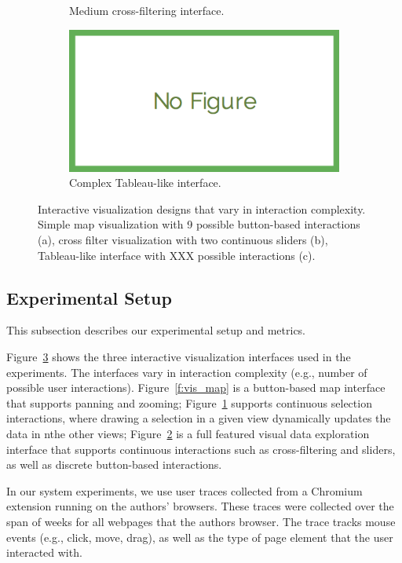 \begin{figure}
\begin{subfigure}[t]{.32\textwidth}
    \caption{Medium cross-filtering interface.}
    \label{f:vis_xfilter} 
  \end{subfigure}
  \begin{subfigure}[t]{.32\textwidth}
    \includegraphics[width = .99\columnwidth]{figures/nofig}
    \caption{Complex Tableau-like interface.}
    \label{f:vis_tableau} 
  \end{subfigure}
  \caption{Interactive visualization designs that vary in interaction complexity.  
  Simple map visualization with 9 possible button-based interactions (a), cross filter visualization with two continuous sliders (b),
Tableau-like interface with XXX possible interactions (c).}

  \label{f:interfaces}
\end{figure}



\subsection{Experimental Setup}
This subsection describes our experimental setup and metrics.

Figure~\ref{f:interfaces} shows the three interactive visualization interfaces used in the experiments.  The interfaces vary in interaction complexity (e.g., number of possible user interactions).  Figure~\ref{f:vis_map} is a button-based map interface that supports panning and zooming;  Figure~\ref{f:vis_xfilter} supports continuous selection interactions, where drawing a selection in a given view dynamically updates the data in nthe other views; Figure~\ref{f:vis_tableau} is a full featured visual data exploration interface that supports continuous interactions such as cross-filtering and sliders, as well as discrete button-based interactions. 

In our system experiments, we use  user traces collected from a Chromium extension running on the authors' browsers.  These traces were collected over the span of  weeks for all webpages that the authors browser.  The trace tracks mouse events (e.g., click, move, drag), as well as the type of page element that the user interacted with. 


